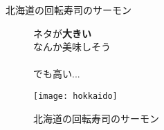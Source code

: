 \begin{frame}[fragile,c]{北海道の回転寿司のサーモン}
    \centering

    \begin{figure}[H]
        \begin{minipage}{0.55\hsize}
            \centering
            ネタが\textbf{大きい}\\
            なんか\alert{美味しそう}\\
            　\\
            でも高い...\\
        \end{minipage}
        \begin{minipage}{0.4\hsize}
            \centering
            \texttt{[image: hokkaido]}
            \caption{北海道の回転寿司のサーモン}
            \label{fig:hokkaido}
        \end{minipage}
    \end{figure}

\end{frame}
